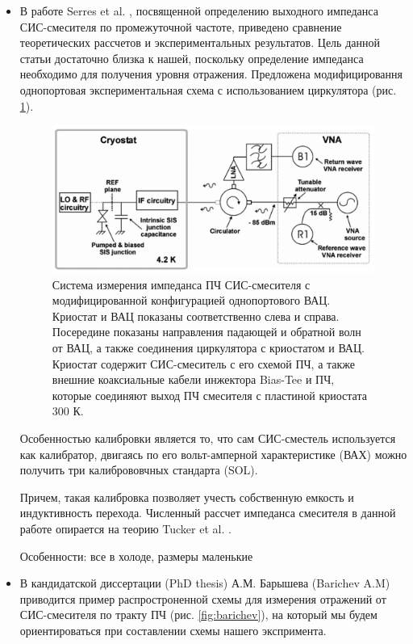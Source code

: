\documentclass[a4paper]{article}
\begin{document}
\begin{itemize}
    \item В работе Serres et al. \cite{Serres}, посвященной определению выходного импеданса СИС-смесителя по        промежуточной частоте, приведено сравнение теоретических 
        рассчетов и экспериментальных результатов. Цель данной статьи достаточно близка к нашей, поскольку определение импеданса необходимо для получения уровня отражения.
        Предложена модифицировання однопортовая экспериментальная схема с использованием циркулятора (рис. \ref{fig:serres-scheme}).
        \begin{figure}[H]
            \centering
            \includegraphics[scale=0.45]{serres-scheme.png}
            \caption{Система измерения импеданса ПЧ СИС-смесителя с модифицированной конфигурацией однопортового ВАЦ. Криостат и ВАЦ показаны соответственно слева и справа. Посередине показаны направления падающей и обратной волн от ВАЦ, а также соединения циркулятора с криостатом и ВАЦ. Криостат содержит СИС-смеситель с его схемой ПЧ, а также внешние коаксиальные кабели инжектора Bias-Tee и ПЧ, которые соединяют выход ПЧ смесителя с пластиной криостата 300 К. \cite{Serres}}
            \label{fig:serres-scheme}
        \end{figure}
        Особенностью калибровки является то, что сам СИС-сместель используется как калибратор, двигаясь по его вольт-амперной характеристике (ВАХ) можно получить три калибрововчных стандарта (SOL).\par
        Причем, такая калибровка позволяет учесть собственную емкость и индуктивность перехода.
        Численный рассчет импеданса смесителя в данной работе опирается на теорию Tucker et al. \cite{Tucker}.
        \par
        Особенности: все в холоде, размеры маленькие
        \par
    \item В кандидатской диссертации (PhD thesis) А.М. Барышева (Barichev A.M) \cite{Barichev} приводится пример распростроненной схемы для измерения отражений от СИС-смесителя по тракту     ПЧ (рис. \ref{fig:barichev}), на который мы будем ориентироваться при составлении схемы нашего экспримента.

\end{itemize}
\end{document}
